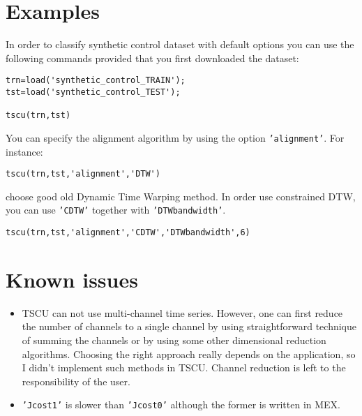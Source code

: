 \documentclass{article}
\begin{document}
\section{Examples}
In order to classify synthetic control dataset with default options you can use the following commands provided that you first downloaded the dataset:
\begin{verbatim}
trn=load('synthetic_control_TRAIN');
tst=load('synthetic_control_TEST');

tscu(trn,tst)
\end{verbatim}
You can specify the alignment algorithm by using the option \texttt{'alignment'}. For instance:
\begin{verbatim}
tscu(trn,tst,'alignment','DTW')
\end{verbatim}
choose good old Dynamic Time Warping method. In order use constrained DTW, you can use \texttt{'CDTW'} together with \texttt{'DTWbandwidth'}.
\begin{verbatim}
tscu(trn,tst,'alignment','CDTW','DTWbandwidth',6)
\end{verbatim}

\section{Known issues}
\begin{itemize}
\item TSCU can not use multi-channel time series. However, one can first reduce the number of channels to a single channel by using straightforward technique of summing the channels or by using some other dimensional reduction algorithms. Choosing the right approach really depends on the application, so I didn't implement such methods in TSCU. Channel reduction is left to the responsibility of the user.
\item \texttt{'Jcost1'} is slower than \texttt{'Jcost0'} although the former is written in MEX.
\end{itemize}


\end{document}
